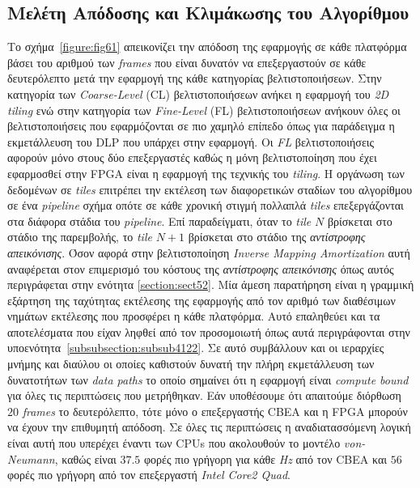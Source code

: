 \subsection[6.2.1 Μελέτη Απόδοσης και Κλιμάκωσης του Αλγορίθμου]{Μελέτη Απόδοσης και Κλιμάκωσης του Αλγορίθμου}
\label{subsection:sub621}
\indent
Το σχήμα~\ref{figure:fig61} απεικονίζει την απόδοση της εφαρμογής σε κάθε πλατφόρμα βάσει του αριθμού των \textsl{frames} που είναι δυνατόν να επεξεργαστούν σε κάθε δευτερόλεπτο μετά την εφαρμογή της κάθε κατηγορίας βελτιστοποιήσεων. Στην κατηγορία των \textsl{Coarse-Level} (CL) βελτιστοποιήσεων ανήκει η εφαρμογή του \textsl{2D tiling} ενώ στην κατηγορία των \textsl{Fine-Level} (FL) βελτιστοποιήσεων ανήκουν όλες οι βελτιστοποιήσεις που εφαρμόζονται σε πιο χαμηλό επίπεδο όπως για παράδειγμα η εκμετάλλευση του \ac{DLP} που υπάρχει στην εφαρμογή.\newline \indent 
Οι \textsl{FL} βελτιστοποιήσεις αφορούν μόνο στους δύο επεξεργαστές καθώς η μόνη βελτιστοποίηση που έχει εφαρμοσθεί στην \ac{FPGA} είναι η εφαρμογή της τεχνικής του \textsl{tiling}. Η οργάνωση των δεδομένων σε \textsl{tiles} επιτρέπει την εκτέλεση των διαφορετικών σταδίων του αλγορίθμου σε ένα \textsl{pipeline} σχήμα οπότε σε κάθε χρονική στιγμή πολλαπλά \textsl{tiles} επεξεργάζονται στα διάφορα στάδια του \textsl{pipeline}. Επί παραδείγματι, όταν το \textsl{tile} \(N\) βρίσκεται στο στάδιο της παρεμβολής, το \textsl{tile} \(N + 1\) βρίσκεται στο στάδιο της \textsl{αντίστροφης απεικόνισης}. Όσον αφορά στην βελτιστοποίηση \textsl{Inverse Mapping Amortization} αυτή αναφέρεται στον επιμερισμό του κόστους της \textsl{αντίστροφης απεικόνισης} όπως αυτός περιγράφεται στην ενότητα \ref{section:sect52}.\newline \indent
Μία άμεση παρατήρηση είναι η γραμμική εξάρτηση της ταχύτητας εκτέλεσης της εφαρμογής από τον αριθμό των διαθέσιμων νημάτων εκτέλεσης που προσφέρει η κάθε πλατφόρμα. Αυτό επαληθεύει και τα αποτελέσματα που είχαν ληφθεί από τον προσομοιωτή όπως αυτά περιγράφονται στην υποενότητα~\ref{subsubsection:subsub4122}. Σε αυτό συμβάλλουν και οι ιεραρχίες μνήμης και διαύλου οι οποίες καθιστούν δυνατή την πλήρη εκμετάλλευση των δυνατοτήτων των \textsl{data paths} το οποίο σημαίνει ότι η εφαρμογή είναι \textsl{compute bound} για όλες τις περιπτώσεις που μετρήθηκαν. Εάν υποθέσουμε ότι απαιτούμε διόρθωση \(20\) \textsl{frames} το δευτερόλεπτο, τότε μόνο ο επεξεργαστής \ac{CBEA} και η \ac{FPGA} μπορούν να έχουν την επιθυμητή απόδοση. Σε όλες τις περιπτώσεις η αναδιατασσόμενη λογική είναι αυτή που υπερέχει έναντι των \acp{CPU} που ακολουθούν το μοντέλο \textsl{von-Neumann}, καθώς είναι \(37.5\) φορές πιο γρήγορη για κάθε \textsl{Hz} από τον \ac{CBEA} και \(56\) φορές πιο γρήγορη από τον επεξεργαστή \textsl{Intel Core2 Quad}.\newline \indent
